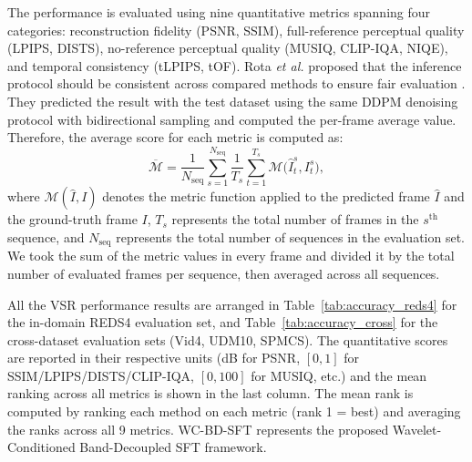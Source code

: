 The performance is evaluated using nine quantitative metrics 
spanning four categories: reconstruction fidelity (PSNR, SSIM), 
full-reference perceptual quality (LPIPS, DISTS), no-reference 
perceptual quality (MUSIQ, CLIP-IQA, NIQE), and temporal 
consistency (tLPIPS, tOF). Rota \emph{et al.} proposed that the 
inference protocol should be consistent across compared methods 
to ensure fair evaluation \cite{rota2024stablevsr}. They 
predicted the result with the test dataset using the same DDPM 
denoising protocol with bidirectional sampling and computed the 
per-frame average value. Therefore, the average score for each 
metric is computed as:
\begin{equation}
\label{eq:metric_avg}
\overline{\mathcal{M}} = 
\frac{1}{N_{\mathrm{seq}}} \sum_{s=1}^{N_{\mathrm{seq}}} 
\frac{1}{T_s} \sum_{t=1}^{T_s} 
\mathcal{M}\big(\hat{I}^{s}_t, I^{s}_t\big),
\end{equation}
where $\mathcal{M}(\hat{I}, I)$ denotes the metric function 
applied to the predicted frame $\hat{I}$ and the ground-truth 
frame $I$, $T_s$ represents the total number of frames in the 
$s^{\mathrm{th}}$ sequence, and $N_{\mathrm{seq}}$ represents 
the total number of sequences in the evaluation set. We took 
the sum of the metric values in every frame and divided it by 
the total number of evaluated frames per sequence, then 
averaged across all sequences.

All the VSR performance results are arranged in 
Table~\ref{tab:accuracy_reds4} for the in-domain REDS4 
evaluation set, and Table~\ref{tab:accuracy_cross} for the 
cross-dataset evaluation sets (Vid4, UDM10, SPMCS). The 
quantitative scores are reported in their respective units 
(dB for PSNR, $[0, 1]$ for SSIM/LPIPS/DISTS/CLIP-IQA, 
$[0, 100]$ for MUSIQ, etc.) and the mean ranking across all 
metrics is shown in the last column. The mean rank is computed 
by ranking each method on each metric (rank 1 = best) and 
averaging the ranks across all 9 metrics. WC-BD-SFT 
represents the proposed Wavelet-Conditioned Band-Decoupled 
SFT framework.

